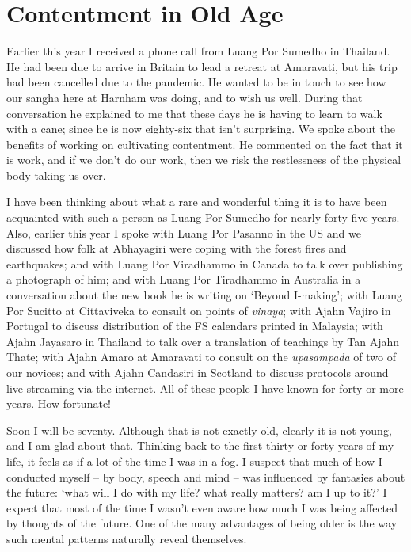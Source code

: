 \section{Contentment in Old Age}

Earlier this year I received a phone call from Luang Por Sumedho in
Thailand. He had been due to arrive in Britain to lead a retreat at
Amaravati, but his trip had been cancelled due to the pandemic. He
wanted to be in touch to see how our sangha here at Harnham was doing,
and to wish us well. During that conversation he explained to me that
these days he is having to learn to walk with a cane; since he is now
eighty-six that isn't surprising. We spoke about the benefits of working
on cultivating contentment. He commented on the fact that it is work,
and if we don't do our work, then we risk the restlessness of the
physical body taking us over.

I have been thinking about what a rare and wonderful thing it is to have
been acquainted with such a person as Luang Por Sumedho for nearly
forty-five years. Also, earlier this year I spoke with Luang Por Pasanno
in the US and we discussed how folk at Abhayagiri were coping with the
forest fires and earthquakes; and with Luang Por Viradhammo in Canada to
talk over publishing a photograph of him; and with Luang Por Tiradhammo
in Australia in a conversation about the new book he is writing on
`Beyond I-making'; with Luang Por Sucitto at Cittaviveka to consult on
points of \emph{vinaya}; with Ajahn Vajiro in Portugal to discuss
distribution of the FS calendars printed in Malaysia; with Ajahn
Jayasaro in Thailand to talk over a translation of teachings by Tan
Ajahn Thate; with Ajahn Amaro at Amaravati to consult on the
\emph{upasampada} of two of our novices; and with Ajahn Candasiri in
Scotland to discuss protocols around \mbox{live-streaming} via the internet.
All of these people I have known for forty or more years. How fortunate!

Soon I will be seventy. Although that is not exactly old, clearly it is not young, and I am glad about that. Thinking back to the first thirty or forty years of my
life, it feels as if a lot of the time I was in a fog. I suspect that
much of how I conducted myself -- by body, speech and mind -- was
influenced by fantasies about the future: `what will I do with my life?
what really matters? am I up to it?' I expect that most of the time I
wasn't even aware how much I was being affected by thoughts of the
future. One of the many advantages of being older is the way such mental
patterns naturally reveal themselves.

